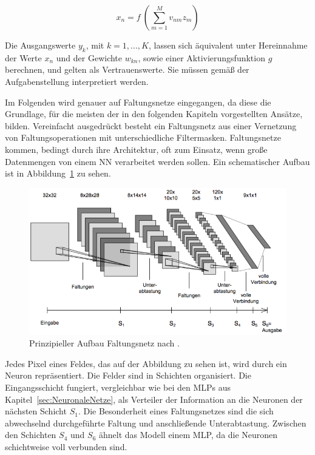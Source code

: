 \documentclass[times, 12pt,twocolumn]{article}
\begin{document}
\footnotesize
\begin{equation} 
x_n = f~(\sum_{m=1}^M v_{nm}z_m)
	\label{eq:AusgabeVerdeckteSchicht}
\end{equation}
\small

Die Ausgangswerte $y_k$, mit $k=1,...,K$, lassen sich äquivalent unter Hereinnahme der Werte $x_n$ und der Gewichte $w_{kn}$, sowie einer Aktivierungsfunktion $g$ berechnen, und gelten als Vertrauenswerte. Sie müssen gemäß der Aufgabenstellung interpretiert werden. 


 \label{sec:Faltungsnetze}
Im Folgenden wird genauer auf Faltungsnetze eingegangen, da diese die Grundlage, für die meisten der in den folgenden Kapiteln vorgestellten Ansätze, bilden. Vereinfacht ausgedrückt besteht ein Faltungsnetz aus einer Vernetzung von Faltungsoperationen mit unterschiedliche Filtermasken. Faltungsnetze kommen, bedingt durch ihre Architektur, oft zum Einsatz, wenn große Datenmengen von einem NN verarbeitet werden sollen. Ein schematischer Aufbau ist in Abbildung~\ref{fig:CNN} zu sehen. 

\begin{figure}
	\flushleft
	\includegraphics[width=\columnwidth]{Bilder/structure-cnn.jpg}
	\caption{Prinzipieller Aufbau Faltungsnetz nach \cite{Osadchy}.}
	\label{fig:CNN}
\end{figure}

Jedes Pixel eines Feldes, das auf der Abbildung zu sehen ist, wird durch ein Neuron repräsentiert. Die Felder sind in Schichten organisiert. Die Eingangsschicht fungiert, vergleichbar wie bei den MLPs aus Kapitel~\ref{sec:NeuronaleNetze}, als Verteiler der Information an die Neuronen der nächsten Schicht $S_1$. Die Besonderheit eines Faltungsnetzes sind die sich abwechselnd durchgeführte Faltung und anschließende Unterabtastung. Zwischen den Schichten $S_4$ und $S_6$ ähnelt das Modell einem MLP, da die Neuronen schichtweise voll verbunden sind.\\
\end{document}
